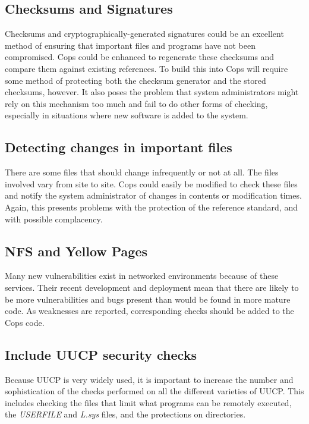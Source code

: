 \subsection{Checksums and Signatures}

Checksums and cryptographically-generated signatures could be an
excellent method of ensuring that important files and programs have not been
compromised.   {\sc Cops} could be enhanced to regenerate these checksums and
compare them against existing references.  To build this into {\sc Cops} will
require some method of protecting both the checksum generator and the stored
checksums, however.  It also poses the problem that system administrators
might rely on this mechanism too much and fail to do other forms of
checking, especially in situations where new software is added to the system.

\subsection{Detecting changes in important files}

There are some files that should  change infrequently or not at all. The
files involved vary from site to site.  {\sc Cops}
could easily be modified to check these files and notify the system administrator
of changes in contents or modification times.  Again, this presents problems
with the protection of the reference standard, and with possible complacency.

\subsection{NFS and Yellow Pages}

Many new vulnerabilities exist in networked environments because of these
services.  Their recent development and deployment mean that there are likely
to be more vulnerabilities and bugs present than would be found in more
mature code.    As weaknesses are reported, corresponding checks should be
added to the {\sc Cops} code.

\subsection{Include UUCP security checks}

Because UUCP is very widely used, it is important to increase the
number and sophistication of the checks performed on all the different
varieties of UUCP.  This includes checking the files that limit what
programs can be remotely executed, the {\it USERFILE} and {\it L.sys}
files, and the protections on directories.

